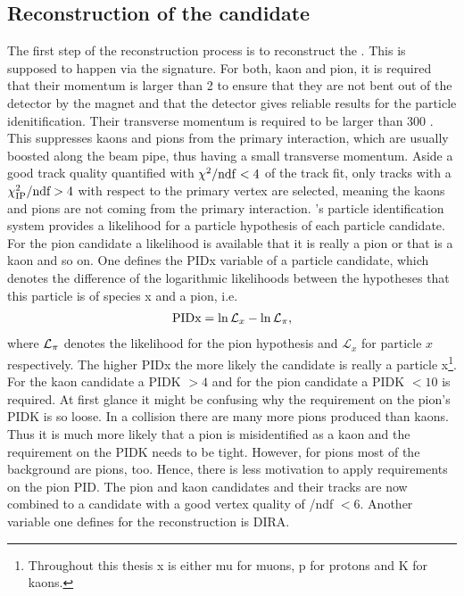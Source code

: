 \subsection{Reconstruction of the \Dz candidate}
\label{sec:Selection_D0}
The first step of the reconstruction process is to reconstruct the \Dz.
This is supposed to happen via the \DToKpi signature.
For both, kaon and pion, it is required that their momentum is larger than 2 \gev to ensure that they are not bent out of the detector by the magnet and that the \rich detector gives reliable results for the particle idenitification.
Their transverse momentum is required to be larger than 300 \mev.
This suppresses kaons and pions from the primary interaction, which are usually boosted along the beam pipe, thus having a small transverse momentum.
Aside a good track quality quantified with $\chi^2/\mathrm{ndf} < 4$ of the track fit, only tracks with a $\chi^2_{\rm IP}/\text{ndf} > 4$  with respect to the primary vertex are selected, meaning the kaons and pions are not coming from the primary interaction.
\lhcb's particle identification system provides a likelihood for a particle hypothesis of each particle candidate.
For the pion candidate a likelihood is available that it is really a pion or that is a kaon and so on.
One defines the PIDx variable of a particle candidate, which denotes the difference of the logarithmic likelihoods between the hypotheses that this particle is of species x and a pion, i.e.
\begin{align}
    \text{PIDx} = \ln \mathcal{L}_x - \ln \mathcal{L}_{\pi}, \label{eq:PIDdef}
\end{align}
where $\mathcal{L}_{{\pi}}$ denotes the likelihood for the pion hypothesis and $\mathcal{L}_{x}$ for particle $x$ respectively.
The higher PIDx the more likely the candidate is really a particle x\footnote{Throughout this thesis x is either mu for muons, p for protons and K for kaons.}.
For the kaon candidate a PIDK $>4$ and for the pion candidate a PIDK $<10$ is required.
At first glance it might be confusing why the requirement on the pion's PIDK is so loose.
In a \proton\proton collision there are many more pions produced than kaons.
Thus it is much more likely that a pion is misidentified as a kaon and the requirement on the PIDK needs to be tight.
However, for pions most of the background are pions, too.
Hence, there is less motivation to apply requirements on the pion PID.
The pion and kaon candidates and their tracks are now combined to a \Dz candidate with a good vertex quality of \chisqvtx/ndf $<6$.
Another variable one defines for the reconstruction is DIRA.
